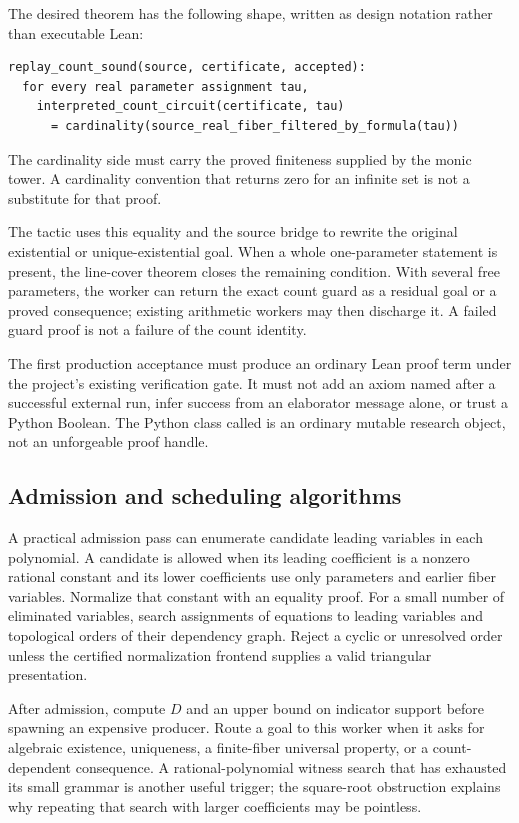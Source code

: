 The desired theorem has the following shape, written as design notation rather than executable Lean:
\begin{lstlisting}
replay_count_sound(source, certificate, accepted):
  for every real parameter assignment tau,
    interpreted_count_circuit(certificate, tau)
      = cardinality(source_real_fiber_filtered_by_formula(tau))
\end{lstlisting}
The cardinality side must carry the proved finiteness supplied by the monic tower. A cardinality convention that returns zero for an infinite set is not a substitute for that proof.

The tactic uses this equality and the source bridge to rewrite the original existential or unique-existential goal. When a whole one-parameter statement is present, the line-cover theorem closes the remaining condition. With several free parameters, the worker can return the exact count guard as a residual goal or a proved consequence; existing arithmetic workers may then discharge it. A failed guard proof is not a failure of the count identity.

The first production acceptance must produce an ordinary Lean proof term under the project's existing verification gate. It must not add an axiom named after a successful external run, infer success from an elaborator message alone, or trust a Python Boolean. The Python class called  is an ordinary mutable research object, not an unforgeable proof handle.

\subsection{Admission and scheduling algorithms}

A practical admission pass can enumerate candidate leading variables in each polynomial. A candidate is allowed when its leading coefficient is a nonzero rational constant and its lower coefficients use only parameters and earlier fiber variables. Normalize that constant with an equality proof. For a small number of eliminated variables, search assignments of equations to leading variables and topological orders of their dependency graph. Reject a cyclic or unresolved order unless the certified normalization frontend supplies a valid triangular presentation.

After admission, compute $D$ and an upper bound on indicator support before spawning an expensive producer. Route a goal to this worker when it asks for algebraic existence, uniqueness, a finite-fiber universal property, or a count-dependent consequence. A rational-polynomial witness search that has exhausted its small grammar is another useful trigger; the square-root obstruction explains why repeating that search with larger coefficients may be pointless.

